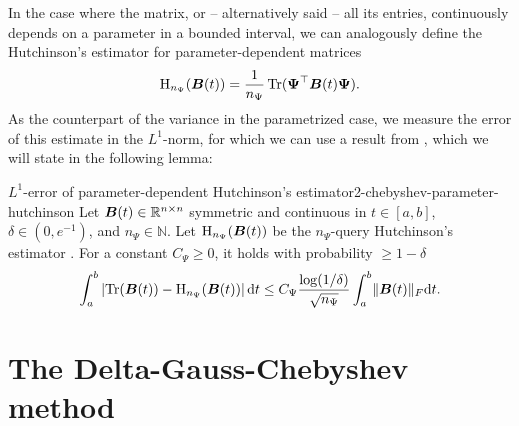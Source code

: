 In the case where the matrix, or -- alternatively said -- all its entries, continuously depends on a
parameter in a bounded interval, we can analogously define the Hutchinson's
estimator for parameter-dependent matrices
\begin{equation}
    \operatorname{H}_{n_{\Psi}}(\boldsymbol{B}(t)) = \frac{1}{n_{\Psi}} \operatorname{Tr}(\boldsymbol{\Psi}^{\top} \boldsymbol{B}(t) \boldsymbol{\Psi}).
    \label{equ:2-chebyshev-DGC-hutchionson-estimator-parameter}
\end{equation}
As the counterpart of the variance in the parametrized case, we measure the
error of this estimate in the $L^1$-norm, for which we can use a result
from \cite{he2023parameter}, which we will state in the following lemma:
\begin{lemma}{$L^1$-error of parameter-dependent Hutchinson's estimator}{2-chebyshev-parameter-hutchinson}
    Let $\boldsymbol{B}(t) \in \mathbb{R}^{n \times n}$ symmetric and continuous in
    $t \in [a, b]$, $\delta \in (0, e^{-1})$, and $n_{\Psi} \in \mathbb{N}$.
    Let $\operatorname{H}_{n_{\Psi}}(\boldsymbol{B}(t))$ be the $n_{\Psi}$-query
    Hutchinson's estimator .
    For a constant $C_{\Psi} \geq 0$, it holds with probability $\geq 1 - \delta$
    \begin{equation}
        \int_{a}^{b} \left| \operatorname{Tr}(\boldsymbol{B}(t)) - \operatorname{H}_{n_{\Psi}}(\boldsymbol{B}(t)) \right| \mathrm{d}t \leq C_{\Psi} \frac{\log(1/\delta)}{\sqrt{n_{\Psi}}} \int_{a}^{b} \lVert \boldsymbol{B}(t) \rVert _F \mathrm{d}t.
    \end{equation}
\end{lemma}


\section{The Delta-Gauss-Chebyshev method}
\label{sec:2-chebyshev-delta-gauss-chebyshev}


